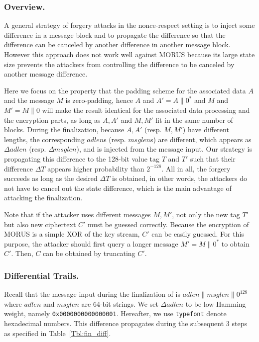 \documentclass{llncs}
\begin{document}
\subsubsection{Overview.} 
A general strategy of forgery attacks in the nonce-respect setting is to inject some difference in a message block and to propagate the difference so that the difference can be canceled by another difference in another message block. However this approach does not work well against MORUS because its large state size prevents the attackers from controlling the difference to be canceled by another message difference.

Here we focus on the property that the padding scheme for the associated data $A$ and the message $M$ is zero-padding, hence $A$ and $A'=A\|0^*$ and $M$ and $M'=M\|0$ will make the result identical for the associated data processing and the encryption parts, as long as $A,A'$ and $M,M'$ fit in the same number of blocks. During the finalization, because $A,A'$ (resp. $M,M'$) have different lengths, the corresponding $adlen$s (resp. $msglen$s) are different, which appears as $\Delta adlen$ (resp. $\Delta msglen$), and is injected from the message input. Our strategy is propagating this difference to the 128-bit value tag $T$ and $T'$ such that their difference $\Delta T$ appears higher probability than $2^{-128}$. All in all, the forgery succeeds as long as the desired $\Delta T$ is obtained, in other words, the attackers do not have to cancel out the state difference, which is the main advantage of attacking the finalization.

Note that if the attacker uses different messages $M,M'$, not only the new tag $T'$ but also new ciphertext $C'$ must be guessed correctly. Because the encryption of MORUS is a simple XOR of the key stream, $C'$ can be easily guessed. For this purpose, the attacker should first query a longer message $M'=M\|0^*$ to obtain $C'$. Then, $C$ can be obtained by truncating $C'$.

\subsubsection{Differential Trails.}
Recall that the message input during the finalization of  is $adlen\|msglen\|0^{128}$ where $adlen$ and $msglen$ are 64-bit strings. We set $\Delta adlen$ to be low Hamming weight, namely {\tt 0x0000000000000001}. Hereafter, we use {\tt typefont} denote hexadecimal numbers. This difference propagates during the subsequent 3 steps as specified in Table~\ref{Tbl:fin_diff}.
\end{document}
